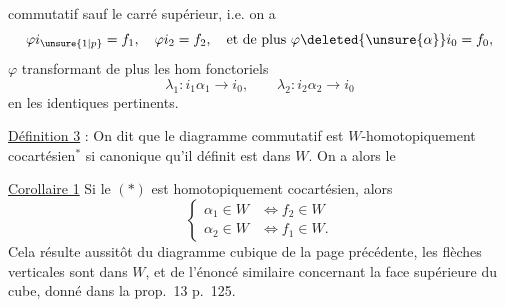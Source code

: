 commutatif sauf le carré supérieur, i.e. on a
\[
\varphi i_{\unsure{1|p}}=f_1,\quad \varphi i_2=f_2,\quad\text{et de plus }\varphi \deleted{\unsure{\alpha}}i_0=f_0,
\]
$\varphi$ transformant de plus les hom fonctoriels
\[
\lambda_1:i_1\alpha_1\to i_0,\qquad\lambda_2:i_2\alpha_2\to i_0
\]
en les    identiques pertinents.

\uline{Définition 3} : On dit que le diagramme commutatif
est $W$-homotopiquement cocartésien$^{\ast}$   si  canonique
qu'il définit est dans $W$.
On a alors le

\uline{Corollaire 1}  Si le   $(\ast)$ est homotopiquement cocartésien, alors
\[
\left\{\begin{aligned}
\alpha_1\in W&\Longleftrightarrow f_2\in W\\
\alpha_2\in W&\Longleftrightarrow f_1\in W .
\end{aligned}\right.
\]
Cela résulte aussitôt du diagramme cubique de la page précédente,   les flèches verticales sont dans $W$, et de l'énoncé similaire concernant la face supérieure du cube, donné dans la prop.~13 p.~125.

